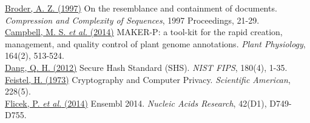 \documentclass{bioinfo}
\begin{document}
\href{http://dx.doi.org/10.1109/SEQUEN.1997.666900}{Broder, A. Z.
(1997)} On the resemblance and containment of documents.
\emph{Compression and Complexity of Sequences}, 1997 Proceedings,
21-29.\\\href{http://dx.doi.org/10.1104/pp.113.230144}{Campbell, M. S.
\emph{et al.} (2014)} MAKER-P: a tool-kit for the rapid creation,
management, and quality control of plant genome annotations. \emph{Plant
Physiology}, 164(2),
513-524.\\\href{http://www.nist.gov/manuscript-publication-search.cfm?pub_id=910977}{Dang,
Q. H. (2012)} Secure Hash Standard (SHS). \emph{NIST FIPS}, 180(4),
1-35.\\\href{http://www.scientificamerican.com/article/cryptography-and-computer-privacy/}{Feistel,
H. (1973)} Cryptography and Computer Privacy. \emph{Scientific
American}, 228(5).\\\href{http://dx.doi.org/10.1093/nar/gkt1196}{Flicek,
P. \emph{et al.} (2014)} Ensembl 2014. \emph{Nucleic Acids Research},
42(D1), D749-D755.
\end{document}
